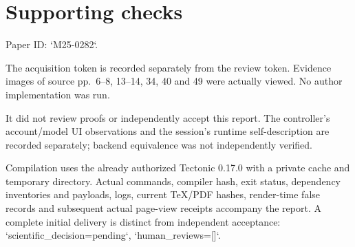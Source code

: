 \documentclass[10pt]{article}
\begin{document}
\section*{Supporting checks}
Paper ID: `M25-0282`.\par
The acquisition token is recorded separately from the review token. Evidence images of source pp. 6–8, 13–14, 34, 40 and 49 were actually viewed. No author implementation was run.\par
It did not review proofs or independently accept this report. The controller’s account/model UI observations and the session’s runtime self-description are recorded separately; backend equivalence was not independently verified.\par
Compilation uses the already authorized Tectonic 0.17.0 with a private cache and temporary directory. Actual commands, compiler hash, exit status, dependency inventories and payloads, logs, current TeX/PDF hashes, render-time false records and subsequent actual page-view receipts accompany the report. A complete initial delivery is distinct from independent acceptance: `scientific\_decision=pending`, `human\_reviews=[]`.\par
\end{document}
